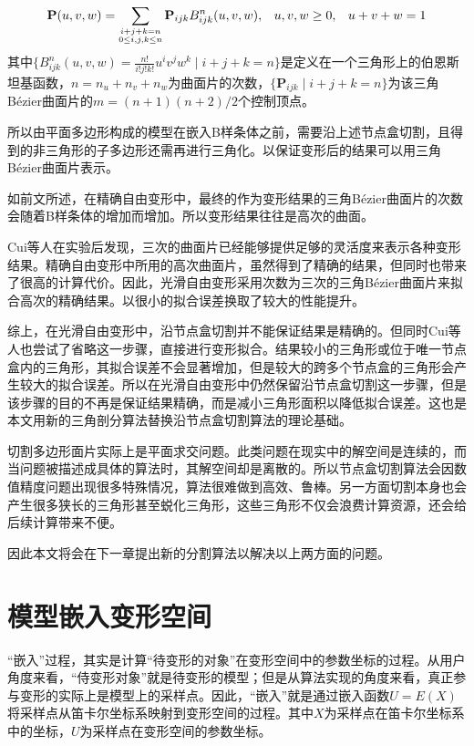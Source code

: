 \begin{equation}
	\footnotesize
	{\mathbf P}(u,v,w)
	= \sum_{\substack{i+j+k=n \\ 0\leq i,j,k\leq n}} {\mathbf P}_{ijk}B^n_{ijk}(u,v,w), \hspace{8 pt} u,v,w\ge0,
		\hspace{8 pt}u+v+w=1
	\label{equ:Puvw}
\end{equation}
其中$\{B_{ijk}^n(u,v,w)=\frac{n!}{i!j!k!}u^iv^jw^k \mid i+j+k=n\}$是定义在一个三角形上的伯恩斯坦基函数，$n=n_u+n_v+n_w$为曲面片的次数，$\{\mathbf P_{ijk} \mid i+j+k=n\}$为该三角Bézier曲面片的$m=(n+1)(n+2)/2$个控制顶点。

所以由平面多边形构成的模型在嵌入B样条体之前，需要沿上述节点盒切割，且得到的非三角形的子多边形还需再进行三角化。以保证变形后的结果可以用三角Bézier曲面片表示。

如前文所述，在精确自由变形中，最终的作为变形结果的三角Bézier曲面片的次数会随着B样条体的增加而增加。所以变形结果往往是高次的曲面。

Cui等人在实验后\cite{Cui15}发现，三次的曲面片已经能够提供足够的灵活度来表示各种变形结果。精确自由变形中所用的高次曲面片，虽然得到了精确的结果，但同时也带来了很高的计算代价。因此，光滑自由变形采用次数为三次的三角Bézier曲面片来拟合高次的精确结果。以很小的拟合误差换取了较大的性能提升。

综上，在光滑自由变形中，沿节点盒切割并不能保证结果是精确的。但同时Cui等人也尝试了省略这一步骤，直接进行变形拟合。结果较小的三角形或位于唯一节点盒内的三角形，其拟合误差不会显著增加，但是较大的跨多个节点盒的三角形会产生较大的拟合误差。所以在光滑自由变形中仍然保留沿节点盒切割这一步骤，但是该步骤的目的不再是保证结果精确，而是减小三角形面积以降低拟合误差。这也是本文用新的三角剖分算法替换沿节点盒切割算法的理论基础。

切割多边形面片实际上是平面求交问题。此类问题在现实中的解空间是连续的，而当问题被描述成具体的算法时，其解空间却是离散的。所以节点盒切割算法会因数值精度问题出现很多特殊情况，算法很难做到高效、鲁棒。另一方面切割本身也会产生很多狭长的三角形甚至蜕化三角形，这些三角形不仅会浪费计算资源，还会给后续计算带来不便。

因此本文将会在下一章提出新的分割算法以解决以上两方面的问题。

\section{模型嵌入变形空间}
“嵌入”过程，其实是计算“待变形的对象”在变形空间中的参数坐标的过程。从用户角度来看，“侍变形对象”就是待变形的模型；但是从算法实现的角度来看，真正参与变形的实际上是模型上的采样点。因此，“嵌入”就是通过嵌入函数$U=E(X)$将采样点从笛卡尔坐标系映射到变形空间的过程。其中$X$为采样点在笛卡尔坐标系中的坐标，$U$为采样点在变形空间的参数坐标。

